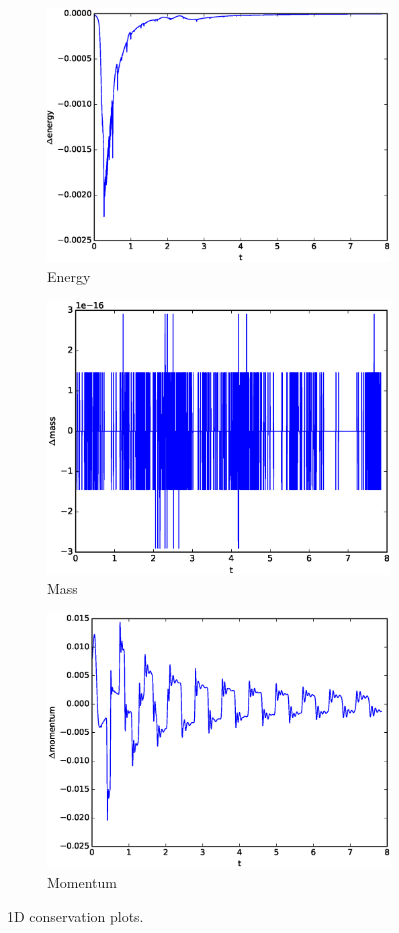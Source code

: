 \begin{figure}[h!]
    \centering
    \begin{subfigure}[b]{0.9\textwidth}
        \centering
        \includegraphics[width=1.1\textwidth,height=0.52\textwidth]{images/E1d.eps}\hfill
        \caption{Energy}
        \label{fig:Energy}
    \end{subfigure}
    \hfill
    \begin{subfigure}[b]{0.9\textwidth}
        \centering
        \includegraphics[width=1.1\textwidth, height=0.52\textwidth]{images/Ma1d.eps}\hfill
        \caption{Mass}
        \label{fig:Mass}
    \end{subfigure}
    \hfill
    \begin{subfigure}[b]{0.9\textwidth}
        \centering
        \includegraphics[width=1.1\textwidth,height=0.52\textwidth]{images/Mo1d.eps}\hfill
        \caption{Momentum}
        \label{Momentum}
    \end{subfigure}
    \caption{1D conservation plots.}
    \label{fig:1D_cons}
\end{figure}

